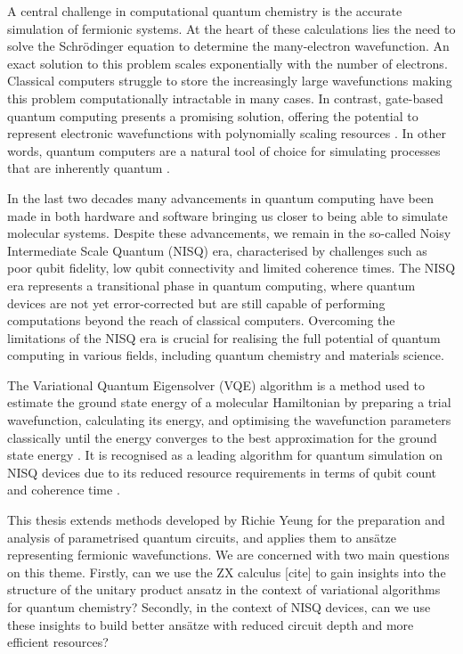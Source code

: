 A central challenge in computational quantum chemistry is the accurate simulation of fermionic systems. At the heart of these calculations lies the need to solve the Schrödinger equation to determine the many-electron wavefunction. An exact solution to this problem scales exponentially with the number of electrons. Classical computers struggle to store the increasingly large wavefunctions making this problem computationally intractable in many cases. In contrast, gate-based quantum computing presents a promising solution, offering the potential to represent electronic wavefunctions with polynomially scaling resources \cite{Burton2023}. In other words, quantum computers are a natural tool of choice for simulating processes that are inherently quantum \cite{Yeung2020}.

In the last two decades many advancements in quantum computing have been made in both hardware and software bringing us closer to being able to simulate molecular systems. Despite these advancements, we remain in the so-called Noisy Intermediate Scale Quantum (NISQ) era, characterised by challenges such as poor qubit fidelity, low qubit connectivity and limited coherence times. The NISQ era represents a transitional phase in quantum computing, where quantum devices are not yet error-corrected but are still capable of performing computations beyond the reach of classical computers. Overcoming the limitations of the NISQ era is crucial for realising the full potential of quantum computing in various fields, including quantum chemistry and materials science.

The Variational Quantum Eigensolver (VQE) algorithm is a method used to estimate the ground state energy of a molecular Hamiltonian by preparing a trial wavefunction, calculating its energy, and optimising the wavefunction parameters classically until the energy converges to the best approximation for the ground state energy \cite{McClean2016}. It is recognised as a leading algorithm for quantum simulation on NISQ devices due to its reduced resource requirements in terms of qubit count and coherence time \cite{Kirby2020}.

This thesis extends methods developed by Richie Yeung \cite{Yeung2020} for the preparation and analysis of parametrised quantum circuits, and applies them to ansätze representing fermionic wavefunctions. We are concerned with two main questions on this theme. Firstly, can we use the ZX calculus [cite] to gain insights into the structure of the unitary product ansatz in the context of variational algorithms for quantum chemistry? Secondly, in the context of NISQ devices, can we use these insights to build better ansätze with reduced circuit depth and more efficient resources?
